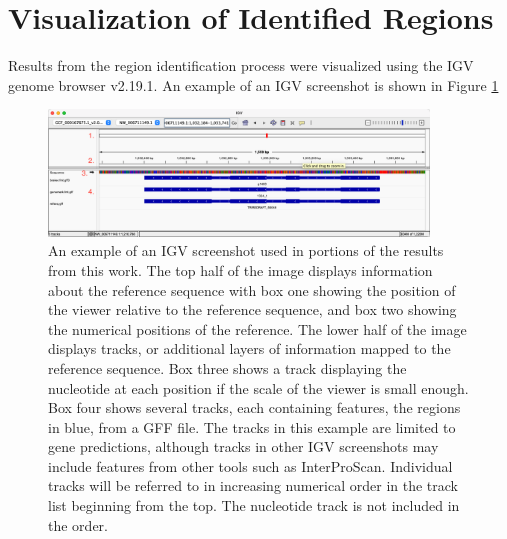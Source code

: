 \section{Visualization of Identified Regions}

Results from the region identification process were visualized using
the IGV genome browser v2.19.1\cite{Robinson2011}. An example of an
IGV screenshot is shown in Figure \ref{fig:igv-methods}

\begin{figure}
  \centering
  \includegraphics[width=0.9\textwidth]{figures/igv/igv-agreement-thin-number}
  \caption[IGV example]{An example of an IGV screenshot used in
    portions of the results from this work. The top half of the image
    displays information about the reference sequence with box one
    showing the position of the viewer relative to the reference
    sequence, and box two showing the numerical positions of the
    reference. The lower half of the image displays tracks, or
    additional layers of information mapped to the reference
    sequence. Box three shows a track displaying the nucleotide at
    each position if the scale of the viewer is small enough. Box four
    shows several tracks, each containing features, the regions in
    blue, from a GFF file. The tracks in this example are limited to
    gene predictions, although tracks in other IGV screenshots may
    include features from other tools such as InterProScan. Individual
    tracks will be referred to in increasing numerical order in the
    track list beginning from the top. The nucleotide track is not
    included in the order.}
  \label{fig:igv-methods}
\end{figure}

